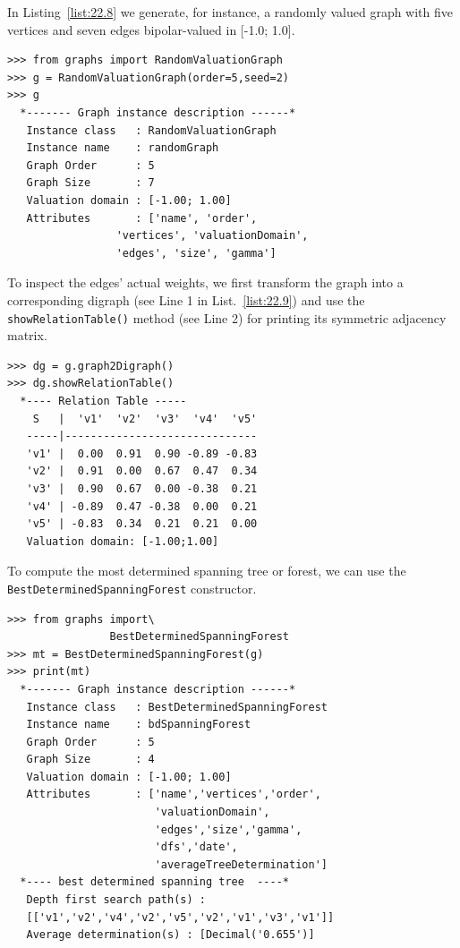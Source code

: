 In Listing~\vref{list:22.8} we generate, for instance, a randomly valued graph with five vertices and seven edges bipolar-valued in [-1.0; 1.0].
\begin{lstlisting}[caption={Generating randomly bipolar-valued graphs.},label=list:22.8]
>>> from graphs import RandomValuationGraph
>>> g = RandomValuationGraph(order=5,seed=2)
>>> g
  *------- Graph instance description ------*
   Instance class   : RandomValuationGraph
   Instance name    : randomGraph
   Graph Order      : 5
   Graph Size       : 7
   Valuation domain : [-1.00; 1.00]
   Attributes       : ['name', 'order',
                 'vertices', 'valuationDomain',
                 'edges', 'size', 'gamma']
\end{lstlisting}
To inspect the edges' actual weights, we first transform the graph into a corresponding digraph (see Line 1 in List.~\vref{list:22.9}) and use the \texttt{showRelationTable()} method (see Line 2) for printing its symmetric adjacency matrix. 
\begin{lstlisting}[caption={Symmetric relation table},label=list:22.9]
>>> dg = g.graph2Digraph()
>>> dg.showRelationTable()
  *---- Relation Table -----
    S   |  'v1'	 'v2'  'v3'  'v4'  'v5'	  
   -----|------------------------------
   'v1' |  0.00	 0.91  0.90 -0.89 -0.83	 
   'v2' |  0.91	 0.00  0.67  0.47  0.34	 
   'v3' |  0.90	 0.67  0.00 -0.38  0.21	 
   'v4' | -0.89	 0.47 -0.38  0.00  0.21	 
   'v5' | -0.83	 0.34  0.21  0.21  0.00	 
   Valuation domain: [-1.00;1.00]
\end{lstlisting}

To compute the most determined spanning tree or forest, we can use the \texttt{Best\-DeterminedSpanningForest} constructor.
\begin{lstlisting}[caption={Computing best determined spanning forests.},label=list:22.10]
>>> from graphs import\
                BestDeterminedSpanningForest
>>> mt = BestDeterminedSpanningForest(g)
>>> print(mt)
  *------- Graph instance description ------*
   Instance class   : BestDeterminedSpanningForest
   Instance name    : bdSpanningForest
   Graph Order      : 5
   Graph Size       : 4
   Valuation domain : [-1.00; 1.00]
   Attributes       : ['name','vertices','order',
                       'valuationDomain',
                       'edges','size','gamma',
                       'dfs','date',
                       'averageTreeDetermination']
  *---- best determined spanning tree  ----*
   Depth first search path(s) :
   [['v1','v2','v4','v2','v5','v2','v1','v3','v1']]
   Average determination(s) : [Decimal('0.655')]
\end{lstlisting}

